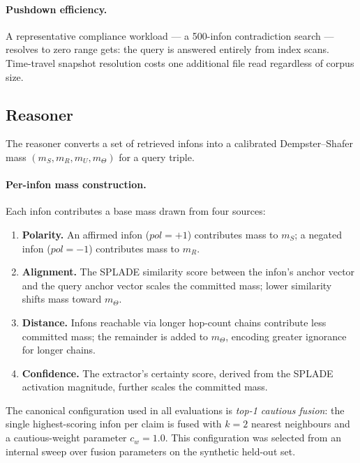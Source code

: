 \paragraph{Pushdown efficiency.}
A representative compliance workload --- a 500-infon contradiction search ---
resolves to zero range gets: the query is answered entirely from index scans.
Time-travel snapshot resolution costs one additional file read regardless of
corpus size.

\subsection{Reasoner}
\label{sec:architecture:reasoner}

The reasoner converts a set of retrieved infons into a calibrated
Dempster--Shafer mass $(m_S, m_R, m_U, m_\Theta)$ for a query triple.

\paragraph{Per-infon mass construction.}
Each infon contributes a base mass drawn from four sources:

\begin{enumerate}
  \item \textbf{Polarity.}  An affirmed infon ($\mathit{pol} = +1$) contributes
    mass to $m_S$; a negated infon ($\mathit{pol} = -1$) contributes mass to
    $m_R$.

  \item \textbf{Alignment.}  The SPLADE similarity score between the infon's
    anchor vector and the query anchor vector scales the committed mass; lower
    similarity shifts mass toward $m_\Theta$.

  \item \textbf{Distance.}  Infons reachable via longer hop-count chains
    contribute less committed mass; the remainder is added to $m_\Theta$,
    encoding greater ignorance for longer chains.

  \item \textbf{Confidence.}  The extractor's certainty score, derived from
    the SPLADE activation magnitude, further scales the committed mass.
\end{enumerate}

The canonical configuration used in all evaluations is \emph{top-1 cautious
fusion}: the single highest-scoring infon per claim is fused with $k = 2$
nearest neighbours and a cautious-weight parameter $c_w = 1.0$.  This
configuration was selected from an internal sweep over fusion parameters on
the synthetic held-out set.

